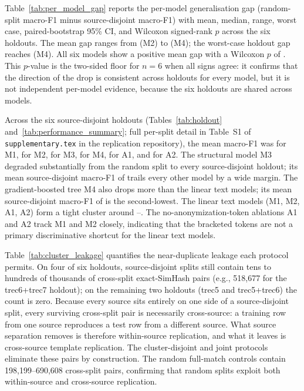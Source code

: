 \documentclass[conference]{IEEEtran}
\begin{document}
Table~\ref{tab:per_model_gap} reports the per-model generalisation gap (random-split macro-F1 minus source-disjoint macro-F1) with mean, median, range, worst case, paired-bootstrap 95\% CI, and Wilcoxon signed-rank $p$ across the six holdouts. The mean gap ranges from \GapMeanMTwo{} (M2) to \GapMeanMFour{} (M4); the worst-case holdout gap reaches \GapWorstMFour{} (M4). All six models show a positive mean gap with a Wilcoxon $p$ of \WilcoxonP{}. This $p$-value is the two-sided floor for $n=6$ when all signs agree: it confirms that the direction of the drop is consistent across holdouts for every model, but it is not independent per-model evidence, because the six holdouts are shared across models.



Across the six source-disjoint holdouts (Tables~\ref{tab:holdout} and~\ref{tab:performance_summary}; full per-split detail in Table~S1 of \texttt{supplementary.tex} in the replication repository), the mean macro-F1 was \SourceMeanMacroFOneMOne{} for M1, \SourceMeanMacroFOneMTwo{} for M2, \SourceMeanMacroFOneMThree{} for M3, \SourceMeanMacroFOneMFour{} for M4, \SourceMeanMacroFOneAOne{} for A1, and \SourceMeanMacroFOneATwo{} for A2. The structural model M3 degraded substantially from the random split to every source-disjoint holdout; its mean source-disjoint macro-F1 of \SourceMeanMacroFOneMThree{} trails every other model by a wide margin. The gradient-boosted tree M4 also drops more than the linear text models; its mean source-disjoint macro-F1 of \SourceMeanMacroFOneMFour{} is the second-lowest. The linear text models (M1, M2, A1, A2) form a tight cluster around \SourceMeanMacroFOneMOne{}--\SourceMeanMacroFOneATwo{}. The no-anonymization-token ablations A1 and A2 track M1 and M2 closely, indicating that the bracketed tokens are not a primary discriminative shortcut for the linear text models.

Table~\ref{tab:cluster_leakage} quantifies the near-duplicate leakage each protocol permits. On four of six holdouts, source-disjoint splits still contain tens to hundreds of thousands of cross-split exact-SimHash pairs (e.g., 518,677 for the trec6+trec7 holdout); on the remaining two holdouts (trec5 and trec5+trec6) the count is zero. Because every source sits entirely on one side of a source-disjoint split, every surviving cross-split pair is necessarily cross-source: a training row from one source reproduces a test row from a different source. What source separation removes is therefore within-source replication, and what it leaves is cross-source template replication. The cluster-disjoint and joint protocols eliminate these pairs by construction. The random full-match controls contain 198,199--690,608 cross-split pairs, confirming that random splits exploit both within-source and cross-source replication.
\end{document}
